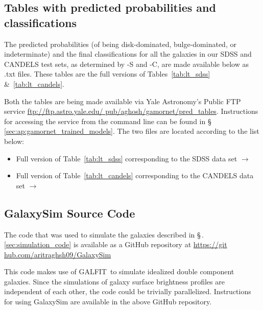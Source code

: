 \subsection{ Tables with predicted probabilities and classifications}\label{sec:ap:prob_tables}
                                                                          
The predicted probabilities (of being disk-dominated, bulge-dominated, or indeterminate) and the final classifications for all the galaxies in our SDSS and CANDELS test sets, as determined by \gamornet{}-S and -C, are made available below as .txt files. These tables are the full versions of Tables~\ref{tab:lt_sdss} \&~\ref{tab:lt_candels}.

Both the tables are being made available via Yale Astronomy's Public FTP service \href{ftp://ftp.astro.yale.edu/pub/aghosh/gamornet/pred_tables}{\url{ftp://ftp.astro.yale.edu/ pub/aghosh/gamornet/pred\_tables}}. Instructions for accessing the service from the command line can be found in \S\,\ref{sec:ap:gamornet_trained_models}. The two files are located according to the list below:

\begin{itemize}
    \item Full version of Table~\ref{tab:lt_sdss} corresponding to the SDSS data set $\xrightarrow{}$ 
    \item Full version of Table~\ref{tab:lt_candels} corresponding to the CANDELS data set $\xrightarrow{}$ 
\end{itemize}

\subsection{ GalaxySim Source Code }\label{sec:ap:galsim}

The code that was used to simulate the galaxies described in \S\,.\ref{sec:simulation_code} is available as a GitHub repository at \href{https://github.com/aritraghsh09/GalaxySim}{https://git hub.com/aritraghsh09/GalaxySim}

This code makes use of GALFIT\,\citep{galfit} to simulate idealized double component galaxies. Since the simulations of galaxy surface brightness profiles are independent of each other, the code could be trivially parallelized. Instructions for using GalaxySim are available in the above GitHub repository. 
